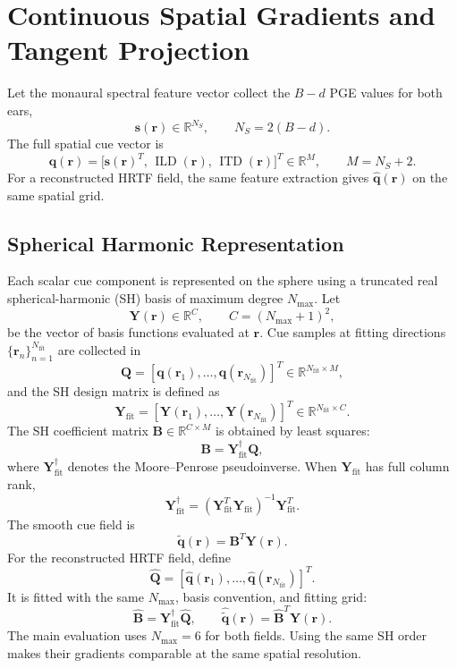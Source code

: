 \documentclass[journal]{IEEEtran}
\begin{document}
\section{Continuous Spatial Gradients and Tangent Projection}
Let the monaural spectral feature vector collect the \(B-d\) PGE values for both ears,
\[
\mathbf{s}(\mathbf{r})\in\mathbb{R}^{N_S},
\qquad N_S=2(B-d).
\]
The full spatial cue vector is
\[
\mathbf{q}(\mathbf{r})
=
\bigl[\mathbf{s}(\mathbf{r})^T,\,\operatorname{ILD}(\mathbf{r}),\,\operatorname{ITD}(\mathbf{r})\bigr]^T
\in\mathbb{R}^{M},
\qquad M=N_S+2.
\]
For a reconstructed HRTF field, the same feature extraction gives
\(\widehat{\mathbf{q}}(\mathbf{r})\) on the same spatial grid.

\subsection{Spherical Harmonic Representation}
Each scalar cue component is represented on the sphere using a truncated real spherical-harmonic (SH) basis of maximum degree \(N_{\max}\). Let
\[
\mathbf{Y}(\mathbf{r}) \in \mathbb{R}^{C}, \qquad C=(N_{\max}+1)^2,
\]
be the vector of basis functions evaluated at \(\mathbf{r}\). Cue samples at fitting directions \(\{\mathbf{r}_n\}_{n=1}^{N_{\mathrm{fit}}}\) are collected in
\[
\mathbf{Q}
=
[\mathbf{q}(\mathbf{r}_1),\ldots,\mathbf{q}(\mathbf{r}_{N_{\mathrm{fit}}})]^T
\in\mathbb{R}^{N_{\mathrm{fit}}\times M},
\]
and the SH design matrix is defined as
\[
\mathbf{Y}_{\mathrm{fit}}
=
[\mathbf{Y}(\mathbf{r}_1),\ldots,\mathbf{Y}(\mathbf{r}_{N_{\mathrm{fit}}})]^T
\in\mathbb{R}^{N_{\mathrm{fit}}\times C}.
\]
The SH coefficient matrix \(\mathbf{B}\in\mathbb{R}^{C\times M}\) is obtained by least squares:
\begin{equation}
\mathbf{B} = \mathbf{Y}_{\mathrm{fit}}^{\dagger}\mathbf{Q},
\end{equation}
where \(\mathbf{Y}_{\mathrm{fit}}^{\dagger}\) denotes the Moore--Penrose pseudoinverse. When \(\mathbf{Y}_{\mathrm{fit}}\) has full column rank,
\begin{equation}
\mathbf{Y}_{\mathrm{fit}}^{\dagger}
=
\left(\mathbf{Y}_{\mathrm{fit}}^T\mathbf{Y}_{\mathrm{fit}}\right)^{-1}
\mathbf{Y}_{\mathrm{fit}}^T.
\end{equation}
The smooth cue field is
\begin{equation}
\widetilde{\mathbf{q}}(\mathbf{r}) = \mathbf{B}^{T}\mathbf{Y}(\mathbf{r}).
\end{equation}
For the reconstructed HRTF field, define
\[
\widehat{\mathbf{Q}}
=
[\widehat{\mathbf{q}}(\mathbf{r}_1),\ldots,\widehat{\mathbf{q}}(\mathbf{r}_{N_{\mathrm{fit}}})]^T .
\]
It is fitted with the same \(N_{\max}\), basis convention, and fitting grid:
\begin{equation}
\widehat{\mathbf{B}} = \mathbf{Y}_{\mathrm{fit}}^{\dagger}\widehat{\mathbf{Q}},
\qquad
\widehat{\widetilde{\mathbf{q}}}(\mathbf{r})
=
\widehat{\mathbf{B}}^T\mathbf{Y}(\mathbf{r}).
\end{equation}
The main evaluation uses \(N_{\max}=6\) for both fields. Using the same SH order makes their gradients comparable at the same spatial resolution.
\end{document}
